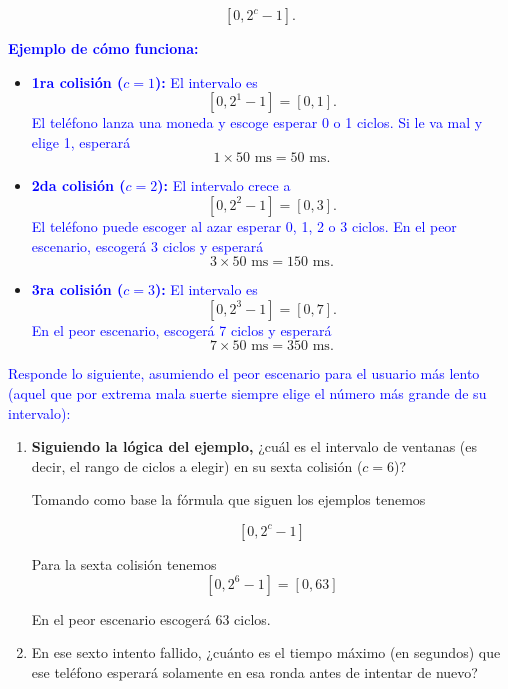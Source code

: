 {    \[
        [0,2^c-1].
    \]

    \textcolor{blue}{\textbf{Ejemplo de cómo funciona:}}

    \begin{itemize}

        \item \textcolor{blue}{\textbf{1ra colisión ($c=1$):}
        El intervalo es}
        \[
            [0,2^1-1]=[0,1].
        \]
        \textcolor{blue}{El teléfono lanza una moneda y escoge esperar 0 o 1 ciclos.
        Si le va mal y elige 1, esperará}
        \[
            1\times50\text{ ms}=50\text{ ms}.
        \]

        \item \textcolor{blue}{\textbf{2da colisión ($c=2$):}
        El intervalo crece a}
        \[
            [0,2^2-1]=[0,3].
        \]
        \textcolor{blue}{El teléfono puede escoger al azar esperar 0, 1, 2 o 3 ciclos.
        En el peor escenario, escogerá 3 ciclos y esperará}
        \[
            3\times50\text{ ms}=150\text{ ms}.
        \]

        \item \textcolor{blue}{\textbf{3ra colisión ($c=3$):}
        El intervalo es}
        \[
            [0,2^3-1]=[0,7].
        \]
        \textcolor{blue}{En el peor escenario, escogerá 7 ciclos y esperará}
        \[
            7\times50\text{ ms}=350\text{ ms}.
        \]

    \end{itemize}

    \noindent
    \textcolor{blue}{Responde lo siguiente, asumiendo el peor escenario para el usuario
    más lento (aquel que por extrema mala suerte siempre elige el número
    más grande de su intervalo):}

    \begin{enumerate}

        \item \textcolor{azul}{\textbf{Siguiendo la lógica del ejemplo,} ¿cuál es el
        intervalo de ventanas (es decir, el rango de ciclos a elegir) en
        su sexta colisión ($c=6$)?}

        Tomando como base la fórmula que siguen los ejemplos tenemos 

        $$[0,2^c-1]$$

        Para la sexta colisión tenemos 
        $$[0,2^6-1] = [0,63]$$

        En el peor escenario escogerá 63 ciclos.

        \item \textcolor{azul}{En ese sexto intento fallido, ¿cuánto es el tiempo máximo
        (en segundos) que ese teléfono esperará solamente en esa ronda
        antes de intentar de nuevo?}


\end{enumerate}}
